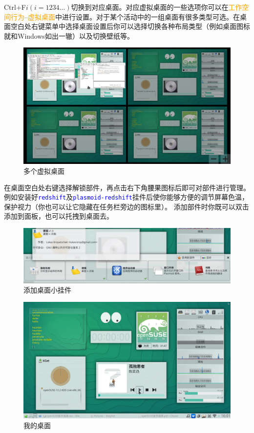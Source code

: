 \documentclass[12pt,openany]{book}
\newcommand{\soft}[1]{\texttt{\textcolor{blue}{#1}}}
\newcommand{\menu}[1]{\textcolor{orange}{#1}}
\begin{document}
Ctrl+F$i(i=1234\ldots)$切换到对应桌面。对应虚拟桌面的一些选项你可以在\menu{工作空间行为}--\menu{虚拟桌面}中进行设置。对于某个活动中的一组桌面有很多类型可选。在桌面空白处右键菜单中选择桌面设置后你可以选择切换各种布局类型（例如桌面图标就和Windows如出一辙）以及切换壁纸等。
\begin{figure}[htb]
\centering
\includegraphics[width=\textwidth]{./pic/virtualdesk.png} 
\caption{多个虚拟桌面}
\end{figure}
在桌面空白处右键选择解锁部件，再点击右下角腰果图标后即可对部件进行管理。例如安装好\soft{redshift}及\soft{plasmoid-redshift}挂件后使你能够方便的调节屏幕色温，保护视力（你也可以让它隐藏在任务栏旁边的图标里）。
添加部件时你既可以双击添加到面板，也可以托拽到桌面去。
\begin{figure}[htb]
\centering
\includegraphics[width=\textwidth]{./pic/plasma.png} 
\caption{添加桌面小挂件}
\end{figure}

\begin{figure}[htb]
 \centering
 \includegraphics[width=\textwidth]{./pic/desktop.png}
 \caption{我的桌面}\label{mydesk}
\end{figure}
\end{document}
